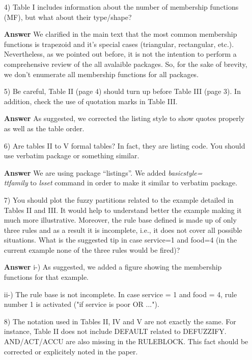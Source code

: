 \documentclass[10pt,a4paper]{article}
\begin{document}
\begin{itemize}
   \item[4)] Table I includes information about the number of membership functions (MF),
   but what about their type/shape?

	\item[\textbf{Answer}] We clarified in the main text that the most common membership functions is trapezoid and it's special cases (triangular, rectangular, etc.). 
	Nevertheless, as we pointed out before, it is not the intention to perform a comprehensive review of the all avalaible packages. So, for the sake of brevity, we don't enumerate all membership functions for all packages.
		
   \item[5)] Be careful, Table II (page 4) should turn up before Table III (page 3). In
   addition, check the use of quotation marks in Table III.

	\item[\textbf{Answer}] As suggested, we corrected the listing style to show quotes properly as well as the table order.

   \item[6)] Are tables II to V formal tables? In fact, they are listing code. You should
   use verbatim package or something similar.

	\item[\textbf{Answer}] We are using package ``listings''. We added \textit{basicstyle=\\ttfamily} to \textit{lsset} command in order to make it similar to verbatim package.
	
   \item[7)] You should plot the fuzzy partitions related to the example detailed in
   Tables II and III. It would help to understand better the example making it much
   more illustrative. Moreover, the rule base defined is made up of only three
   rules and as a result it is incomplete, i.e., it does not cover all possible
   situations. What is the suggested tip in case service=1 and food=4 (in the
   current example none of the three rules would be fired)?

	\item[\textbf{Answer}] i-) As suggested, we added a figure showing the membership functions for that example.

	ii-) The rule base is not incomplete. In case service = 1 and food = 4, rule 
	number 1 is activated ("if service is poor OR ...").

   \item[8)] The notation used in Tables II, IV and V are not exactly the same. For
   instance, Table II does not include DEFAULT related to DEFUZZIFY. AND/ACT/ACCU
   are also missing in the RULEBLOCK. This fact should be corrected or explicitely
   noted in the paper.
   

\end{itemize}
\end{document}
